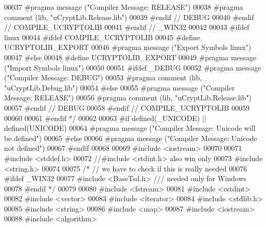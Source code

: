 \begin{DoxyCode}
00037 \textcolor{comment}{      #pragma message ("Compiler Message: RELEASE")}
00038 \textcolor{comment}{      #pragma comment (lib, "uCryptLib.Release.lib")}
00039 \textcolor{comment}{    #endif // DEBUG}
00040 \textcolor{comment}{  #endif // COMPILE\_UCRYPTOLIB}
00041 \textcolor{comment}{#endif // \_WIN32}
00042 \textcolor{comment}{}
00043 \textcolor{comment}{#ifdef linux}
00044 \textcolor{comment}{  #ifdef COMPILE\_UCRYPTOLIB}
00045 \textcolor{comment}{    #define UCRYPTOLIB\_EXPORT}
00046 \textcolor{comment}{    #pragma message ("Export Symbols linux")}
00047 \textcolor{comment}{  #else}
00048 \textcolor{comment}{    #define UCRYPTOLIB\_EXPORT}
00049 \textcolor{comment}{    #pragma message ("Import Symbols linux")}
00050 \textcolor{comment}{}
00051 \textcolor{comment}{    #ifdef \_DEBUG}
00052 \textcolor{comment}{      #pragma message ("Compiler Message: DEBUG")}
00053 \textcolor{comment}{      #pragma comment (lib, "uCryptLib.Debug.lib")}
00054 \textcolor{comment}{    #else}
00055 \textcolor{comment}{      #pragma message ("Compiler Message: RELEASE")}
00056 \textcolor{comment}{      #pragma comment (lib, "uCryptLib.Release.lib")}
00057 \textcolor{comment}{    #endif // DEBUG}
00058 \textcolor{comment}{#endif // COMPILE\_UCRYPTOLIB}
00059 \textcolor{comment}{}
00060 \textcolor{comment}{}
00061 \textcolor{comment}{#endif */}
00062 
00063 \textcolor{preprocessor}{#if defined(\_UNICODE) || defined(UNICODE)}
00064 \textcolor{preprocessor}{  #pragma message ("Compiler Message: Unicode will be defined")}
00065 \textcolor{preprocessor}{#else}
00066 \textcolor{preprocessor}{  #pragma message ("Compiler Message: Unicode not defined")}
00067 \textcolor{preprocessor}{#endif}
00068 
00069 \textcolor{preprocessor}{#include <iostream>}
00070 
00071 \textcolor{preprocessor}{#include <stddef.h>}
00072 \textcolor{comment}{//#include <stdint.h> also win only}
00073 \textcolor{preprocessor}{#include <string.h>}
00074 
00075 \textcolor{comment}{/* // we have to check if this is really needed}
00076 \textcolor{comment}{#ifdef \_WIN32}
00077 \textcolor{comment}{  #include <BaseTsd.h> /// needed only for Windows}
00078 \textcolor{comment}{#endif */}
00079 
00080 \textcolor{preprocessor}{#include <fstream>}
00081 \textcolor{preprocessor}{#include <cstdint>}
00082 \textcolor{preprocessor}{#include <vector>}
00083 \textcolor{preprocessor}{#include <iterator>}
00084 \textcolor{preprocessor}{#include <stdlib.h>}
00085 \textcolor{preprocessor}{#include <string>}
00086 \textcolor{preprocessor}{#include <map>}
00087 \textcolor{preprocessor}{#include <iostream>}
00088 \textcolor{preprocessor}{#include <algorithm>}

\end{DoxyCode}
